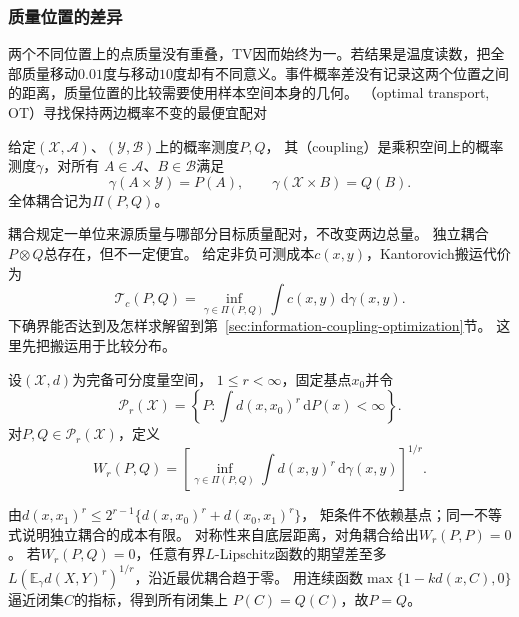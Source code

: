 \subsubsection{质量位置的差异}
\label{sec:information-optimal-transport}

两个不同位置上的点质量没有重叠，TV因而始终为一。若结果是温度读数，把全部质量移动\(0.01\)度与移动\(10\)度却有不同意义。事件概率差没有记录这两个位置之间的距离，质量位置的比较需要使用样本空间本身的几何。
（optimal transport, OT）寻找保持两边概率不变的最便宜配对

\begin{definition}[耦合]
\label{def:information-coupling}
给定\((\mathcal X,\mathcal A)\)、\((\mathcal Y,\mathcal B)\)上的概率测度\(P,Q\)，
其（coupling）是乘积空间上的概率测度\(\gamma\)，对所有
\(A\in\mathcal A\)、\(B\in\mathcal B\)满足
\[
  \gamma(A\times\mathcal Y)=P(A),\qquad
  \gamma(\mathcal X\times B)=Q(B).
\]
全体耦合记为\(\Pi(P,Q)\)。
\end{definition}
耦合规定一单位来源质量与哪部分目标质量配对，不改变两边总量。
独立耦合\(P\otimes Q\)总存在，但不一定便宜。
给定非负可测成本\(c(x,y)\)，Kantorovich搬运代价为
\begin{equation}
  \mathcal T_c(P,Q)=\inf_{\gamma\in\Pi(P,Q)}
                      \int c(x,y)\,\mathrm d\gamma(x,y).
  \label{eq:information-kantorovich-transport}
\end{equation}
下确界能否达到及怎样求解留到第~\ref{sec:information-coupling-optimization}节。
这里先把搬运用于比较分布。

\begin{definition}[Wasserstein距离]
\label{def:information-wasserstein-distance}
设\((\mathcal X,d)\)为完备可分度量空间，
\(1\leq r<\infty\)，固定基点\(x_0\)并令
\[
  \mathcal P_r(\mathcal X)=
   \left\{P:\int d(x,x_0)^r\,\mathrm dP(x)<\infty\right\}.
\]
对\(P,Q\in\mathcal P_r(\mathcal X)\)，定义
\begin{equation}
  W_r(P,Q)=\left[
    \inf_{\gamma\in\Pi(P,Q)}\int d(x,y)^r\,\mathrm d\gamma(x,y)
  \right]^{1/r}.
  \label{eq:information-wasserstein-distance}
\end{equation}
\end{definition}

由\(d(x,x_1)^r\leq2^{r-1}\{d(x,x_0)^r+d(x_0,x_1)^r\}\)，
矩条件不依赖基点；同一不等式说明独立耦合的成本有限。
对称性来自底层距离，对角耦合给出\(W_r(P,P)=0\)。
若\(W_r(P,Q)=0\)，任意有界\(L\)-Lipschitz函数的期望差至多
\(L(\mathbb E_\gamma d(X,Y)^r)^{1/r}\)，沿近最优耦合趋于零。
用连续函数\(\max\{1-kd(x,C),0\}\)逼近闭集\(C\)的指标，得到所有闭集上
\(P(C)=Q(C)\)，故\(P=Q\)。

